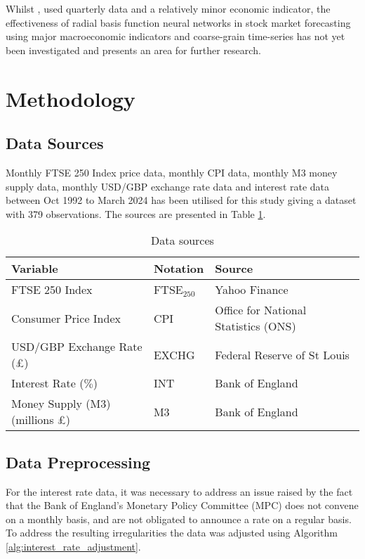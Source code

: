 \documentclass[11pt,a4paper]{article}
\newcommand{\citeboth}[1]{\citeauthor{#1} \citep{#1}}
\begin{document}
Whilst \citeboth{abotaleb2024}, used quarterly data and a relatively minor economic indicator, the effectiveness of radial basis function neural networks in stock market forecasting using 
major macroeconomic indicators and coarse-grain time-series has not yet been investigated and presents an area for further 
research. 

\section{Methodology}
\label{sec:meth}

\subsection{Data Sources}
Monthly FTSE 250 Index price data, 
monthly CPI data, monthly M3 money supply data, monthly USD/GBP exchange 
rate data and interest rate data between Oct 1992 to March 2024 has been 
utilised for this study giving a dataset with 379 observations. The sources 
are presented in Table \ref{table: tabl}.

\clearpage
\begin{table}[h!]
    \centering
    \caption{Data sources}
    \label{table: tabl}
    \begin{tabular}{lll}
        \toprule
        \textbf{Variable} & \textbf{Notation} & \textbf{Source} \\
        \midrule
        FTSE 250 Index & FTSE$_{250}$ & Yahoo Finance \\
        Consumer Price Index & CPI & Office for National Statistics (ONS) \\
        USD/GBP Exchange Rate (£) & EXCHG & Federal Reserve of St Louis \\
        Interest Rate ($\%$) & INT & Bank of England \\
        Money Supply (M3) (millions £) & M3 & Bank of England \\
        \bottomrule
    \end{tabular}
\end{table}

\subsection{Data Preprocessing}
For the interest rate data, it was necessary to address an issue raised by the fact that the Bank of England’s Monetary Policy Committee (MPC) 
does not convene on a monthly basis, and are not obligated to 
announce a rate on a regular basis. To address the resulting irregularities the data was adjusted using Algorithm \ref{alg:interest_rate_adjustment}.
\end{document}
